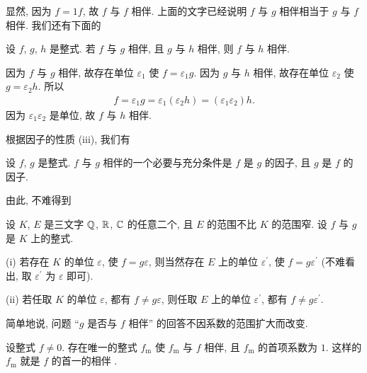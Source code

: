 显然, 因为 $f = 1f$, 故 $f$ 与 $f$ 相伴. 上面的文字已经说明 $f$ 与 $g$ 相伴相当于 $g$ 与 $f$ 相伴. 我们还有下面的
\begin{proposition}
    设 $f$, $g$, $h$ 是整式. 若 $f$ 与 $g$ 相伴, 且 $g$ 与 $h$ 相伴, 则 $f$ 与 $h$ 相伴.
\end{proposition}

\begin{pf}
    因为 $f$ 与 $g$ 相伴, 故存在单位 $\varepsilon_1$ 使 $f = \varepsilon_1 g$. 因为 $g$ 与 $h$ 相伴, 故存在单位 $\varepsilon_2$ 使 $g = \varepsilon_2 h$. 所以
    \begin{align*}
        f = \varepsilon_1 g = \varepsilon_1 (\varepsilon_2 h) = (\varepsilon_1 \varepsilon_2) h.
    \end{align*}
    因为 $\varepsilon_1 \varepsilon_2$ 是单位, 故 $f$ 与 $h$ 相伴.
\end{pf}

根据因子的性质 (iii), 我们有
\begin{proposition}
    设 $f$, $g$ 是整式. $f$ 与 $g$ 相伴的一个必要与充分条件是 $f$ 是 $g$ 的因子, 且 $g$ 是 $f$ 的因子.
\end{proposition}

由此, 不难得到
\begin{proposition}
    设 $K$, $E$ 是三文字 $\mathbb{Q}$, $\mathbb{R}$, $\mathbb{C}$ 的任意二个, 且 $E$ 的范围不比 $K$ 的范围窄. 设 $f$ 与 $g$ 是 $K$ 上的整式.

    (i) 若存在 $K$ 的单位 $\varepsilon$, 使 $f = g\varepsilon$, 则当然存在 $E$ 上的单位 $\varepsilon^{\prime}$, 使 $f = g\varepsilon^{\prime}$ (不难看出, 取 $\varepsilon^{\prime}$ 为 $\varepsilon$ 即可).

    (ii) 若任取 $K$ 的单位 $\varepsilon$, 都有 $f \neq g\varepsilon$, 则任取 $E$ 上的单位 $\varepsilon^{\prime}$, 都有 $f \neq g\varepsilon^{\prime}$.

    简单地说, 问题 ``$g$ 是否与 $f$ 相伴'' 的回答不因系数的范围扩大而改变.
\end{proposition}

\begin{proposition}
    设整式 $f \neq 0$. 存在唯一的整式 $f_\mathrm{m}$ 使 $f_\mathrm{m}$ 与 $f$ 相伴, 且 $f_\mathrm{m}$ 的首项系数为 $1$. 这样的 $f_\mathrm{m}$ 就是 $f$ 的首一的相伴 .
\end{proposition}

